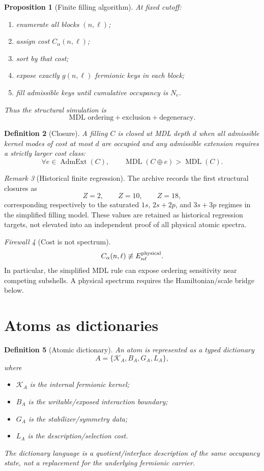 \documentclass[11pt,a4paper]{article}
\newtheorem{definition}{Definition}[section]
\newtheorem{proposition}[definition]{Proposition}
\theoremstyle{remark}
\newtheorem{remark}[definition]{Remark}
\newtheorem{firewall}[definition]{Firewall}
\newcommand{\K}{\mathcal K}
\newcommand{\MDL}{\operatorname{MDL}}
\begin{document}
\begin{proposition}[Finite filling algorithm]
At fixed cutoff:
\begin{enumerate}
\item enumerate all blocks $(n,\ell)$;
\item assign cost $C_{\alpha}(n,\ell)$;
\item sort by that cost;
\item expose exactly $g(n,\ell)$ fermionic keys in each block;
\item fill admissible keys until cumulative occupancy is $N_e$.
\end{enumerate}
Thus the structural simulation is
\[
\boxed{\text{MDL ordering}+\text{exclusion}+\text{degeneracy}.}
\]
\end{proposition}

\begin{definition}[Closure]
A filling $C$ is closed at MDL depth $d$ when all admissible kernel modes of
cost at most $d$ are occupied and any admissible extension requires a strictly
larger cost class:
\[
 \forall e\in\operatorname{AdmExt}(C),
 \qquad \MDL(C\oplus e)>\MDL(C).
\]
\end{definition}

\begin{remark}[Historical finite regression]
The archive records the first structural closures as
\[
 Z=2,\qquad Z=10,\qquad Z=18,
\]
corresponding respectively to the saturated $1s$, $2s+2p$, and $3s+3p$
regimes in the simplified filling model.  These values are retained as
historical regression targets, not elevated into an independent proof of all
physical atomic spectra.
\end{remark}

\begin{firewall}[Cost is not spectrum]
\[
 C_{\alpha}(n,\ell)\not\equiv E^{\rm physical}_{n\ell}.
\]
In particular, the simplified MDL rule can expose ordering sensitivity near
competing subshells.  A physical spectrum requires the Hamiltonian/scale bridge
below.
\end{firewall}

\section{Atoms as dictionaries}

\begin{definition}[Atomic dictionary]
An atom is represented as a typed dictionary
\[
 A=\{\K_A,B_A,G_A,L_A\},
\]
where
\begin{itemize}
\item $\K_A$ is the internal fermionic kernel;
\item $B_A$ is the writable/exposed interaction boundary;
\item $G_A$ is the stabilizer/symmetry data;
\item $L_A$ is the description/selection cost.
\end{itemize}
The dictionary language is a quotient/interface description of the same
occupancy state, not a replacement for the underlying fermionic carrier.
\end{definition}
\end{document}
